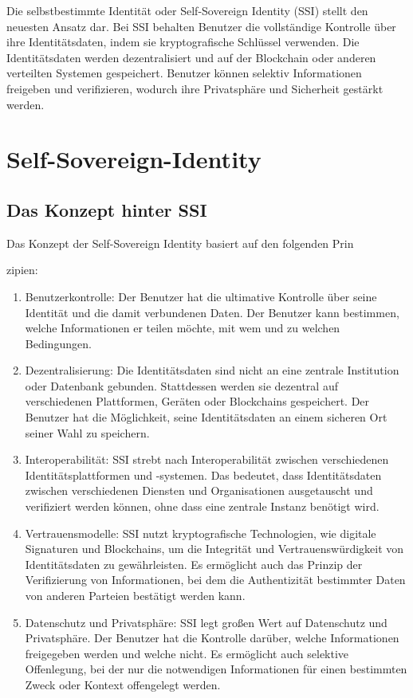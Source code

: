 Die selbstbestimmte Identität oder Self-Sovereign Identity (SSI) stellt den neuesten Ansatz dar. Bei SSI behalten Benutzer die vollständige Kontrolle über ihre Identitätsdaten, indem sie kryptografische Schlüssel verwenden. Die Identitätsdaten werden dezentralisiert und auf der Blockchain oder anderen verteilten Systemen gespeichert. Benutzer können selektiv Informationen freigeben und verifizieren, wodurch ihre Privatsphäre und Sicherheit gestärkt werden.

\section{Self-Sovereign-Identity}

\subsection{Das Konzept hinter SSI}	
	Das Konzept der Self-Sovereign Identity \cite{SOV1} basiert auf den folgenden Prin
	
	zipien:
	
	\begin{enumerate}
		\item Benutzerkontrolle: Der Benutzer hat die ultimative Kontrolle über seine Identität und die damit verbundenen Daten. Der Benutzer kann bestimmen, welche Informationen er teilen möchte, mit wem und zu welchen Bedingungen.
		
		\item Dezentralisierung: Die Identitätsdaten sind nicht an eine zentrale Institution oder Datenbank gebunden. Stattdessen werden sie dezentral auf verschiedenen Plattformen, Geräten oder Blockchains gespeichert. Der Benutzer hat die Möglichkeit, seine Identitätsdaten an einem sicheren Ort seiner Wahl zu speichern.
		
		\item Interoperabilität: SSI strebt nach Interoperabilität zwischen verschiedenen Identitätsplattformen und -systemen. Das bedeutet, dass Identitätsdaten zwischen verschiedenen Diensten und Organisationen ausgetauscht und verifiziert werden können, ohne dass eine zentrale Instanz benötigt wird.
		
		\item Vertrauensmodelle: SSI nutzt kryptografische Technologien, wie digitale Signaturen und Blockchains, um die Integrität und Vertrauenswürdigkeit von Identitätsdaten zu gewährleisten. Es ermöglicht auch das Prinzip der Verifizierung von Informationen, bei dem die Authentizität bestimmter Daten von anderen Parteien bestätigt werden kann.
		
		\item Datenschutz und Privatsphäre: SSI legt großen Wert auf Datenschutz und Privatsphäre. Der Benutzer hat die Kontrolle darüber, welche Informationen freigegeben werden und welche nicht. Es ermöglicht auch selektive Offenlegung, bei der nur die notwendigen Informationen für einen bestimmten Zweck oder Kontext offengelegt werden.
	\end{enumerate}
	

